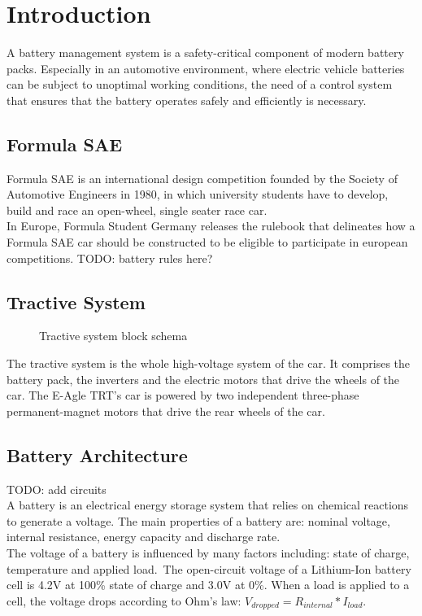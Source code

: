 \chapter{Introduction}
\label{cha:intro}
A battery management system is a safety-critical component of modern battery packs. Especially in an automotive environment, where electric vehicle batteries can be subject to unoptimal working conditions, the need of a control system that ensures that the battery operates safely and efficiently is necessary.

\section{Formula SAE}
Formula SAE is an international design competition founded by the Society of Automotive Engineers in 1980, in which university students have to develop, build and race an open-wheel, single seater race car.\\
In Europe, Formula Student Germany releases the rulebook \cite{fsg2020} that delineates how a Formula SAE car should be constructed to be eligible to participate in european competitions.
TODO: battery rules here?\\

\section{Tractive System}
\begin{figure}[h]
    \centering
    
    \caption{Tractive system block schema}
    \label{fig:tractive_system}
\end{figure}

The tractive system is the whole high-voltage system of the car. It comprises the battery pack, the inverters and the electric motors that drive the wheels of the car.
The E-Agle TRT's car is powered by two independent three-phase permanent-magnet motors that drive the rear wheels of the car.

\section{Battery Architecture}
TODO: add circuits\\
A battery is an electrical energy storage system that relies on chemical reactions to generate a voltage. The main properties of a battery are: nominal voltage, internal resistance, energy capacity and discharge rate.\\
The voltage of a battery is influenced by many factors including: state of charge, temperature and applied load.\ The open-circuit voltage of a Lithium-Ion battery cell is 4.2V at 100\% state of charge and 3.0V at 0\%.
When a load is applied to a cell, the voltage drops according to Ohm's law: $V_{dropped} = R_{internal}*I_{load}$.

